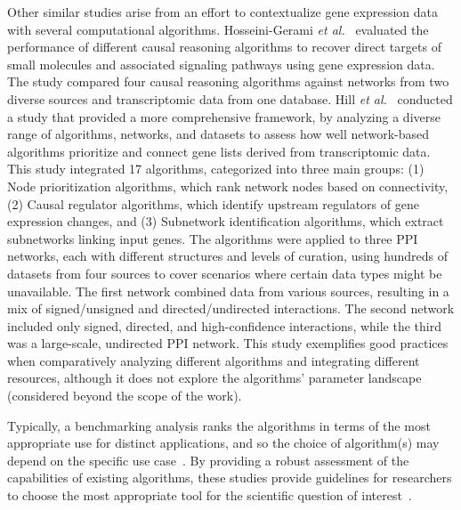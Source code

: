 Other similar studies arise from an effort to contextualize gene expression data with several computational algorithms.
Hosseini-Gerami \textit{et al.}~\cite{RN53} evaluated the performance of different causal reasoning algorithms to recover direct targets of small molecules and associated signaling pathways using gene expression data.
The study compared four causal reasoning algorithms against networks from two diverse sources and transcriptomic data from one database.
Hill \textit{et al.}~\cite{RN37} conducted a study that provided a more comprehensive framework, by analyzing a diverse range of algorithms, networks, and datasets to assess how well network-based algorithms prioritize and connect gene lists derived from transcriptomic data.
This study integrated 17 algorithms, categorized into three main groups: (1) Node prioritization algorithms, which rank network nodes based on connectivity, (2) Causal regulator algorithms, which identify upstream regulators of gene expression changes, and (3) Subnetwork identification algorithms, which extract subnetworks linking input genes.
The algorithms were applied to three \gls{PPI} networks, each with different structures and levels of curation, using hundreds of datasets from four sources to cover scenarios where certain data types might be unavailable.
The first network combined data from various sources, resulting in a mix of signed/unsigned and directed/undirected interactions.
The second network included only signed, directed, and high-confidence interactions, while the third was a large-scale, undirected \gls{PPI} network.
This study exemplifies good practices when comparatively analyzing different algorithms and integrating different resources, although it does not explore the algorithms' parameter landscape (considered beyond the scope of the work).

Typically, a benchmarking analysis ranks the algorithms in terms of the most appropriate use for distinct applications, and so the choice of algorithm(s) may depend on the specific use case~\cite{RN37}.
By providing a robust assessment of the capabilities of existing algorithms, these studies provide guidelines for researchers to choose the most appropriate tool for the scientific question of interest~\cite{RN108}.

